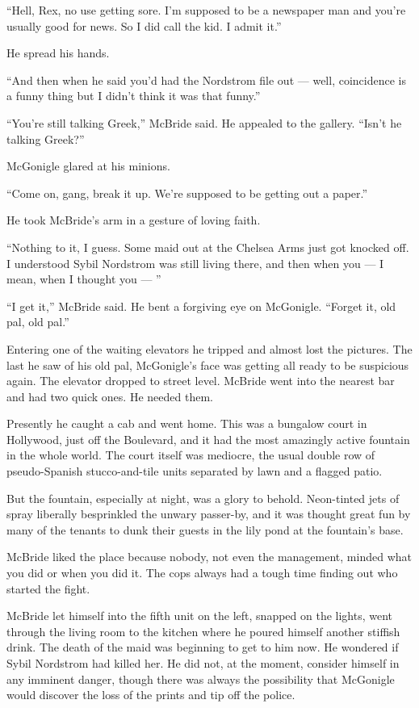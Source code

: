 \documentclass{novel}
\begin{document}
“Hell, Rex, no use getting sore. I’m supposed to be a newspaper man and you’re usually good for news. So I did call the kid. I admit it.”

He spread his hands.

“And then when he said you’d had the Nordstrom file out — well, coincidence is a funny thing but I didn’t think it was that funny.”

“You’re still talking Greek,” McBride said. He appealed to the gallery. “Isn’t he talking Greek?”

McGonigle glared at his minions.

“Come on, gang, break it up. We’re supposed to be getting out a paper.”

He took McBride’s arm in a gesture of loving faith.

“Nothing to it, I guess. Some maid out at the Chelsea Arms just got knocked off. I understood Sybil Nordstrom was still living there, and then when you — I mean, when I thought you — ”

\null

“I get it,” McBride said. He bent a forgiving eye on McGonigle. “Forget it, old pal, old pal.”

Entering one of the waiting elevators he tripped and almost lost the pictures. The last he saw of his old pal, McGonigle’s face was getting all ready to be suspicious again. The elevator dropped to street level. McBride went into the nearest bar and had two quick ones. He needed them.

\scenestars

Presently he caught a cab and went home. This was a bungalow court in Hollywood, just off the Boulevard, and it had the most amazingly active fountain in the whole world. The court itself was mediocre, the usual double row of pseudo-Spanish stucco-and-tile units separated by lawn and a flagged patio.

But the fountain, especially at night, was a glory to behold. Neon-tinted jets of spray liberally besprinkled the unwary passer-by, and it was thought great fun by many of the tenants to dunk their guests in the lily pond at the fountain’s base.

McBride liked the place because nobody, not even the management, minded what you did or when you did it. The cops always had a tough time finding out who started the fight.

McBride let himself into the fifth unit on the left, snapped on the lights, went through the living room to the kitchen where he poured himself another stiffish drink. The death of the maid was beginning to get to him now. He wondered if Sybil Nordstrom had killed her. He did not, at the moment, consider himself in any imminent danger, though there was always the possibility that McGonigle would discover the loss of the prints and tip off the police.
\end{document}
